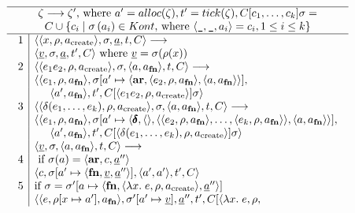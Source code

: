 \RequirePackage[hyphens]{url}\documentclass[12pt,oneside]{amsart}
\newcommand{\kw}[1]{\mathbf{#1}}
\newcommand{\lmd}[2]{\lambda #1.\;#2}
\newcommand{\tab}{\hspace{0.5cm}}
\begin{document}
\begin{figure}[hbpt]
\[\begin{array}{c}\hline
\zeta \longrightarrow \zeta^\prime\text{, where } a^\prime = alloc(\zeta),
    t^\prime = tick(\zeta), C[c_1,\ldots,c_k]\sigma = \\ C \cup \{c_i \mid \sigma\left(a_i\right) \in Kont\text{, where }\langle\verb|_|, \verb|_|, a_i\rangle = c_i, 1\leq i\leq k\}\\ \hline
\begin{array}{c|l}
    1 & \langle\langle x, \rho, a_\text{create}\rangle, \sigma, \underline{a}, t, C\rangle
        \longrightarrow \\ & \langle\underline{v}, \sigma, \underline{a}, t^\prime, C\rangle \text{ where $\underline{v} = \sigma(\rho(x))$} \\
    2 & \langle\langle e_1e_2, \rho, a_\text{create}\rangle, \sigma,
        \langle a, a_\kw{fn}\rangle, t, C\rangle \longrightarrow \\ & \langle\langle e_1, \rho, a_\kw{fn}\rangle, \sigma[a^\prime\mapsto\langle\kw{ar}, \langle e_2, \rho, a_\kw{fn}\rangle, \langle a, a_\kw{fn}\rangle\rangle], \\ & \tab \langle a^\prime, a_\kw{fn}\rangle, t^\prime, C[\langle e_1e_2, \rho, a_\text{create}\rangle]\sigma\rangle \\
    3 & \langle\langle\delta(e_1,\ldots,e_k),\rho,a_\text{create}\rangle, \sigma,
        \langle a, a_\kw{fn}\rangle, t, C\rangle \longrightarrow \\ & \langle\langle e_1, \rho, a_\kw{fn}\rangle, \sigma[a^\prime\mapsto\langle\pmb{\delta}, \langle\rangle, \langle\langle e_2, \rho, a_\kw{fn}\rangle, \ldots, \langle e_k, \rho, a_\kw{fn}\rangle\rangle, \langle a, a_\kw{fn}\rangle\rangle], \\ & \tab \langle a^\prime, a_\kw{fn}\rangle, t^\prime, C[\langle\delta(e_1,\ldots,e_k),\rho,a_\text{create}\rangle]\sigma\rangle \\
    & \langle\underline{v}, \sigma, \langle a, a_\kw{fn}\rangle, t, C\rangle
        \longrightarrow \\
    4 & \text{ if $\sigma(a) = \langle\kw{ar}, c, \underline{a}^{\prime\prime}\rangle$} \\
        & \langle c, \sigma[a^\prime\mapsto\langle\kw{fn}, \underline{v}, \underline{a}^{\prime\prime}\rangle], \langle a^\prime, a^\prime\rangle, t^\prime, C\rangle \\
    5 & \text{if $\sigma = \sigma^\prime[a\mapsto\langle\kw{fn}, \langle\lmd{x}{e}, \rho,
        a_\text{create}\rangle, \underline{a}^{\prime\prime}\rangle]$} \\ & \langle\langle e, \rho[x\mapsto a^\prime], a_\kw{fn}\rangle, \sigma^\prime[a^\prime\mapsto \underline{v}], \underline{a}^{\prime\prime}, t^\prime, C[\langle\lmd{x}{e}, \rho,

\end{array}
\end{array}\]
\end{figure}
\end{document}
